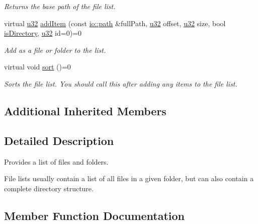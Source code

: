 \begin{DoxyCompactItemize}
\begin{DoxyCompactList}\small\item\em Returns the base path of the file list. \end{DoxyCompactList}\item 
virtual \hyperlink{namespaceirr_a0416a53257075833e7002efd0a18e804}{u32} \hyperlink{classirr_1_1io_1_1IFileList_ad0d90f1bb8a35910f4f877268e2f043e}{add\+Item} (const \hyperlink{namespaceirr_1_1io_a6468281622ce3a1c46b72e19f32dded5}{io\+::path} \&full\+Path, \hyperlink{namespaceirr_a0416a53257075833e7002efd0a18e804}{u32} offset, \hyperlink{namespaceirr_a0416a53257075833e7002efd0a18e804}{u32} size, bool \hyperlink{classirr_1_1io_1_1IFileList_a0f2cb8c99e9ecc4b56d08718c885a5af}{is\+Directory}, \hyperlink{namespaceirr_a0416a53257075833e7002efd0a18e804}{u32} id=0)=0
\begin{DoxyCompactList}\small\item\em Add as a file or folder to the list. \end{DoxyCompactList}\item 
\mbox{\label{classirr_1_1io_1_1IFileList_a2cf4f12d7ee6ab35257169ec23654da8}} 
virtual void \hyperlink{classirr_1_1io_1_1IFileList_a2cf4f12d7ee6ab35257169ec23654da8}{sort} ()=0
\begin{DoxyCompactList}\small\item\em Sorts the file list. You should call this after adding any items to the file list. \end{DoxyCompactList}\end{DoxyCompactItemize}
\subsection*{Additional Inherited Members}


\subsection{Detailed Description}
Provides a list of files and folders. 

File lists usually contain a list of all files in a given folder, but can also contain a complete directory structure. 

\subsection{Member Function Documentation}
\mbox{\label{classirr_1_1io_1_1IFileList_ad0d90f1bb8a35910f4f877268e2f043e}} 
